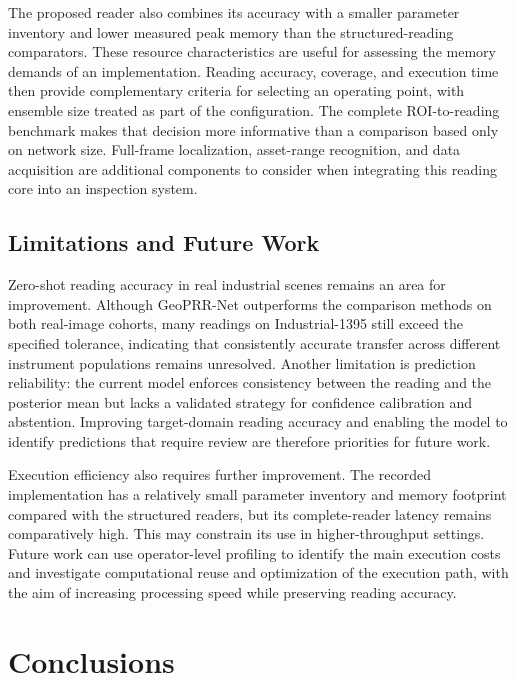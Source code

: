 \documentclass[electronics,article,submit,oneauthor]{Definitions/mdpi}
\newcommand{\modelname}{GeoPRR-Net\xspace}
\begin{document}
The proposed reader also combines its accuracy with a smaller parameter inventory and lower measured peak memory than the structured-reading comparators. These resource characteristics are useful for assessing the memory demands of an implementation. Reading accuracy, coverage, and execution time then provide complementary criteria for selecting an operating point, with ensemble size treated as part of the configuration. The complete ROI-to-reading benchmark makes that decision more informative than a comparison based only on network size. Full-frame localization, asset-range recognition, and data acquisition are additional components to consider when integrating this reading core into an inspection system.

\subsection{Limitations and Future Work}

Zero-shot reading accuracy in real industrial scenes remains an area for improvement. Although \modelname outperforms the comparison methods on both real-image cohorts, many readings on Industrial-1395 still exceed the specified tolerance, indicating that consistently accurate transfer across different instrument populations remains unresolved. Another limitation is prediction reliability: the current model enforces consistency between the reading and the posterior mean but lacks a validated strategy for confidence calibration and abstention. Improving target-domain reading accuracy and enabling the model to identify predictions that require review are therefore priorities for future work.

Execution efficiency also requires further improvement. The recorded implementation has a relatively small parameter inventory and memory footprint compared with the structured readers, but its complete-reader latency remains comparatively high. This may constrain its use in higher-throughput settings. Future work can use operator-level profiling to identify the main execution costs and investigate computational reuse and optimization of the execution path, with the aim of increasing processing speed while preserving reading accuracy.

\section{Conclusions}
\label{sec:conclusion}
\end{document}
